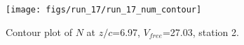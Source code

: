\begin{figure}[H]
\centering
\texttt{[image: figs/run\_17/run\_17\_num\_contour]}
\caption{Contour plot of $N$ at $z/c$=6.97, $V_{free}$=27.03, station 2.}
\label{fig:run_17_num_contour}
\end{figure}


